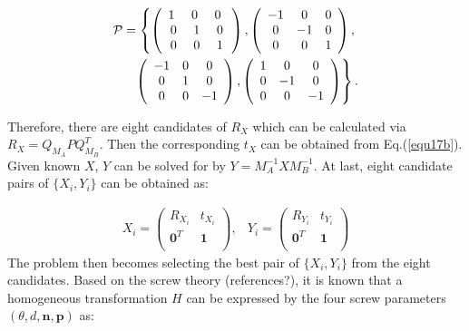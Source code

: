 \documentclass[letterpaper, 10 pt, conference]{ieeeconf}  %
\begin{document}
\begin{equation}\label{equ19}
\begin{split}
{\cal P} = \left\{ \left(\begin{array}{ccc}
1\,\, & 0 \,\, & 0 \,\, \\
0 & 1 & 0\\
0 & 0 & 1 \end{array}\right) , \left(\begin{array}{ccc}
-1 & 0 & 0 \\
0 & -1 & 0\\
0 & 0 & 1 \end{array}\right), \right.\\
\left. \left(\begin{array}{ccc}
-1 & 0 & 0 \\
0 & 1 & 0\\
0 & 0 & -1 \end{array}\right), \left(\begin{array}{ccc}
1 & 0 & 0 \\
0 & -1 & 0\\
0 & 0 & -1 \end{array}\right)\right\}.
\end{split} 
\end{equation}

Therefore, there are eight candidates of $R_{X}$ which can be calculated via $R_{X}=Q_{M_{A}}PQ_{M_{B}}^T$. Then the corresponding $t_{X}$ can be obtained  from Eq.(\ref{equ17b}). Given known $X$, $Y$ can be solved for by $Y = M_A^{-1}XM_B^{-1}$. At last, eight candidate pairs of  $\{X_{i},Y_{i}\}$ can be obtained as: 

\begin{equation}\label{equ20}
\begin{array}{cc}
X_{i}= \left( \begin{array}{cc}
       R_{X_i} & t_{X_i} \\
       \mathbf{0}^{T} & \mathbf{1}\\
\end{array} \right),&
Y_{i}= \left( \begin{array}{cc}
       R_{Y_i} & t_{Y_i} \\
       \mathbf{0}^{T} & \mathbf{1}\\
\end{array} \right)
\end{array}
\end{equation}
The problem then becomes selecting the best pair of $\{X_i, Y_i\}$ from the eight candidates. 
Based on the screw theory (references?), it is known that a homogeneous transformation $H$ can be expressed by the four screw parameters $(\theta,d,\mathbf{n},\mathbf{p})$ as:
\end{document}
